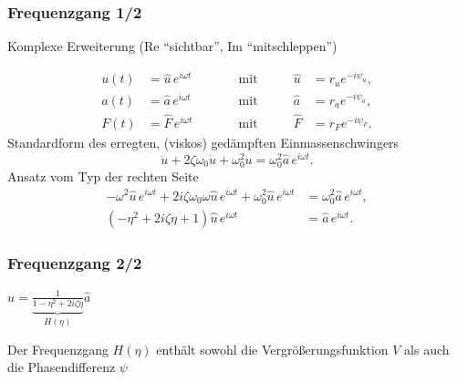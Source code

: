 \documentclass[hyperref={pdfpagemode=FullScreen, colorlinks=false}]{beamer}
\begin{document}
\begin{frame}
\frametitle{Frequenzgang 1/2}
Komplexe Erweiterung (Re ``sichtbar'', Im ``mitschleppen'')
\hspace{1cm}

\begin{align*}
 u(t)&= \hat{u}\,e^{i\omega t} &\qquad & \text{mit} \qquad &\hat{u}&=r_u e^{-i\psi_u},\\
 a(t)&=\hat{a}\,e^{i\omega t} &\qquad & \text{mit} \qquad &\hat{a}&=r_a e^{-i\psi_a},\\
 F(t)&= \hat{F}\,e^{i\omega t} &\qquad & \text{mit} \qquad &\hat{F}&=r_F e^{-i\psi_F}.
\end{align*}
Standardform des erregten, (viskos) gedämpften Einmassenschwingers
\begin{equation*}
 \ddot{u}+2\zeta\omega_0 \dot{u}+\omega_0^2 u = \omega_0^2\hat{a}\,e^{i\omega t}.
\end{equation*}
Ansatz vom Typ der rechten Seite
\begin{align*}
 -\omega^2 \hat{u}\,e^{i\omega t} +2i\zeta\omega_0\omega \hat{u}\,e^{i\omega t} +\omega_0^2  \hat{u}\,e^{i\omega t} &= \omega_0^2\hat{a}\,e^{i\omega t},\\
 \left(-\eta^2 + 2i\zeta\eta +1 \right)\hat{u}\,e^{i\omega t}&= \hat{a}\,e^{i\omega t}.
\end{align*}
\end{frame}

\begin{frame}
\frametitle{Frequenzgang 2/2} 
\hfill
 $\hat{u}=\underbrace{\frac{1}{1-\eta^2 + 2i\zeta\eta}}_{H(\eta)} \hat{a}$
\hfill 


Der Frequenzgang $H(\eta)$ enthält sowohl die Vergrößerungsfunktion $V$ 
als auch die Phasendifferenz $\psi$
\end{frame}
\end{document}
